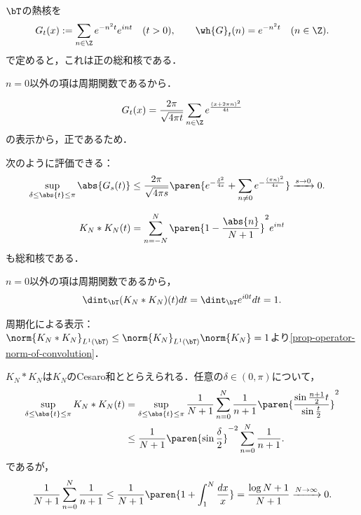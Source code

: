 \documentclass[uplatex,dvipdfmx]{jsreport}
\begin{document}
\begin{example}
    $\bT$の熱核を
    \[G_t(x):=\sum_{n\in\Z}e^{-n^2t}e^{int}\quad(t>0),\qquad \wh{G}_t(n)=e^{-n^2t}\quad(n\in\Z).\]
    で定めると，これは正の総和核である．
\end{example}
\begin{Proof}\mbox{}
    \begin{enumerate}[{[S}1{]}]
        \item $n=0$以外の項は周期関数であるから．
        \item \[G_t(x)=\frac{2\pi}{\sqrt{4\pi t}}\sum_{n\in\Z}e^{\frac{(x+2\pi n)^2}{4t}}\]
        の表示から，正であるため．
        \item 次のように評価できる：
        \begin{align*}
            \sup_{\delta\le\abs{t}\le\pi}\abs{G_s(t)}&\le\frac{2\pi}{\sqrt{4\pi s}}\paren{e^{-\frac{\delta^2}{4s}}+\sum_{n\ne0}e^{-\frac{(\pi n)^2}{4s}}}\xrightarrow{s\to0}0.
        \end{align*}
    \end{enumerate}
\end{Proof}

\begin{example}
    \[K_N*K_N(t)=\sum_{n=-N}^N\paren{1-\frac{\abs{n}}{N+1}}^2e^{int}\]
    も総和核である．
\end{example}
\begin{Proof}\mbox{}
    \begin{enumerate}[{[S}1{]}]
        \item $n=0$以外の項は周期関数であるから，
        \begin{align*}
            \dint_\bT(K_N*K_N)(t)dt=\dint_\bT e^{i0t}dt=1.
        \end{align*}
        \item 周期化による表示：
        $\norm{K_N*K_N}_{L^1(\bT)}\le\norm{K_N}_{L^1(\bT)}\norm{K_N}=1$より\ref{prop-operator-norm-of-convolution}．
        \item $K_N*K_N$は$K_N$のCesaro和ととらえられる．任意の$\delta\in(0,\pi)$について，
        \begin{align*}
            \sup_{\delta\le\abs{t}\le\pi}K_N*K_N(t)&=\sup_{\delta\le\abs{t}\le\pi}\frac{1}{N+1}\sum_{n=0}^N\frac{1}{n+1}\paren{\frac{\sin\frac{n+1}{2}t}{\sin\frac{t}{2}}}^2\\
            &\le\frac{1}{N+1}\paren{\sin\frac{\delta}{2}}^{-2}\sum_{n=0}^N\frac{1}{n+1}.
        \end{align*}
        であるが，
        \[\frac{1}{N+1}\sum_{n=0}^N\frac{1}{n+1}\le\frac{1}{N+1}\paren{1+\int^N_1\frac{dx}{x}}=\frac{\log N+1}{N+1}\xrightarrow{N\to\infty}0.\]
    \end{enumerate}
\end{Proof}
\end{document}
